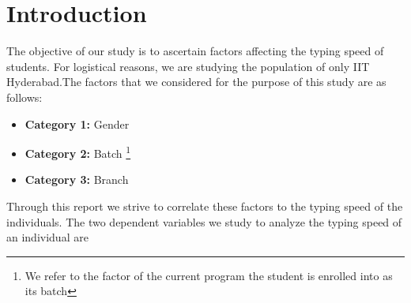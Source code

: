 \documentclass[12pt,a4paper]{report}
\begin{document}
\renewcommand\bibname{References}
\lhead{ }


% 


\newpage

%  

\newpage





\pagestyle{fancy}

\newpage
{} %

\section*{\Huge{Introduction}}

The objective of our study is to ascertain factors affecting the typing speed of students. For logistical reasons, we are studying the population of only IIT Hyderabad.The factors that we considered for the purpose of this study are as follows:

\begin{itemize}
    \item \textbf{Category 1:} Gender
    \item \textbf{Category 2:} Batch \footnote{We refer to the factor of the current program the student is enrolled into as its batch}
    \item \textbf{Category 3:} Branch
\end{itemize}
    
    

Through this report we strive to correlate these factors to the typing speed of the individuals. The two dependent variables we study to analyze  the typing speed of an individual are
\end{document}
